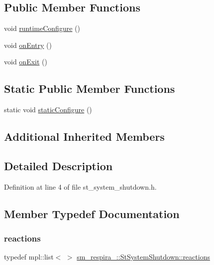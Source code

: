 \subsection*{Public Member Functions}
\begin{DoxyCompactItemize}
\item 
void \hyperlink{structsm__respira__1_1_1StSystemShutdown_a0e64b317e2720facbfeabc99956bf071}{runtime\+Configure} ()
\item 
void \hyperlink{structsm__respira__1_1_1StSystemShutdown_a1a1c466be4f427b79e0276ab7f38344a}{on\+Entry} ()
\item 
void \hyperlink{structsm__respira__1_1_1StSystemShutdown_adc045e262e894feb5f040f9d3e98764a}{on\+Exit} ()
\end{DoxyCompactItemize}
\subsection*{Static Public Member Functions}
\begin{DoxyCompactItemize}
\item 
static void \hyperlink{structsm__respira__1_1_1StSystemShutdown_a3e55c52ddc658248bf37a7c7dc353a44}{static\+Configure} ()
\end{DoxyCompactItemize}
\subsection*{Additional Inherited Members}


\subsection{Detailed Description}


Definition at line 4 of file st\+\_\+system\+\_\+shutdown.\+h.



\subsection{Member Typedef Documentation}
\mbox{\label{structsm__respira__1_1_1StSystemShutdown_ae6fd4a2dbf4f3a8aa45f21074254a24e}} 
\subsubsection{\texorpdfstring{reactions}{reactions}}
{\footnotesize\ttfamily typedef mpl\+::list$<$ $>$ \hyperlink{structsm__respira__1_1_1StSystemShutdown_ae6fd4a2dbf4f3a8aa45f21074254a24e}{sm\+\_\+respira\+\_\+::\+St\+System\+Shutdown\+::reactions}}



